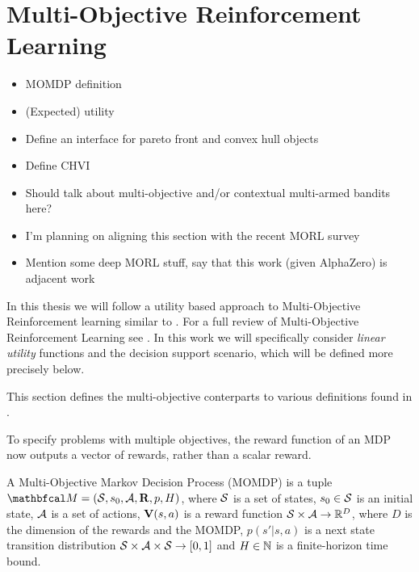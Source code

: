 \section{Multi-Objective Reinforcement Learning}
\label{sec:2-4-morl}
    
    \begin{itemize}
        \item MOMDP definition
        \item (Expected) utility
        \item Define an interface for pareto front and convex hull objects
        \item Define CHVI
        \item Should talk about multi-objective and/or contextual multi-armed bandits here?
        \item I'm planning on aligning this section with the recent MORL survey \cite{morl_survey}
        \item Mention some deep MORL stuff, say that this work (given AlphaZero) is adjacent work
    \end{itemize}


    In this thesis we will follow a utility based approach to Multi-Objective Reinforcement learning similar to . For a full review of Multi-Objective Reinforcement Learning see . In this work we will specifically consider \textit{linear utility} functions and the decision support scenario, which will be defined more precisely below.

    This section defines the multi-objective conterparts to various definitions found in .

    To specify problems with multiple objectives, the reward function of an MDP now outputs a vector of rewards, rather than a scalar reward.

    \begin{defn}
        \label{def:mo_mdp}
        A \textnormal{Multi-Objective Markov Decision Process} (MOMDP) is a tuple $\bfcl{M}=(\cl{S},s_0,\cl{A},\bff{R},p,H)$, where $\mathcal{S}$ is a set of states, $s_0\in\mathcal{S}$ is an initial state, $\mathcal{A}$ is a set of actions, $\mathbf{V}(s,a)$ is a reward function $\mathcal{S}\times \mathcal{A}\rightarrow \mathbb{R}^D$, where $D$ is the dimension of the rewards and the MOMDP, $p(s' | s,a)$ is a next state transition distribution $\mathcal{S} \times \mathcal{A} \times \mathcal{S} \rightarrow [0,1]$ and $H\in\mathbb{N}$ is a finite-horizon time bound.
    \end{defn}

